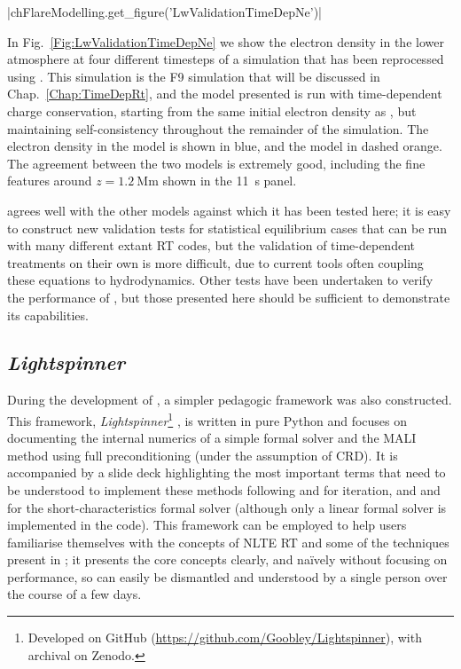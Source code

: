 \py[FlareModelling]|chFlareModelling.get_figure('LwValidationTimeDepNe')|

In Fig.~\ref{Fig:LwValidationTimeDepNe} we show the electron density in the lower atmosphere at four different timesteps of a \Radyn{} simulation that has been reprocessed using \Lw{}.
This simulation is the F9 simulation that will be discussed in Chap.~\ref{Chap:TimeDepRt}, and the \Lw{} model presented is run with time-dependent charge conservation, starting from the same initial electron density as \Radyn{}, but maintaining self-consistency throughout the remainder of the simulation.
The electron density in the \Radyn{} model is shown in blue, and the \Lw{} model in dashed orange.
The agreement between the two models is extremely good, including the fine features around $z=\SI{1.2}{\mega\metre}$ shown in the \SI{11}{\second} panel.

\Lw{} agrees well with the other models against which it has been tested here; it is easy to construct new validation tests for statistical equilibrium cases that can be run with many different extant RT codes, but the validation of time-dependent treatments on their own is more difficult, due to current tools often coupling these equations to hydrodynamics.
Other tests have been undertaken to verify the performance of \Lw{}, but those presented here should be sufficient to demonstrate its capabilities.


\subsection{\emph{Lightspinner}}

During the development of \Lw{}, a simpler pedagogic framework was also constructed.
This framework, \emph{Lightspinner}\footnote{Developed on GitHub (\url{https://github.com/Goobley/Lightspinner}), with archival on Zenodo.} \citep{Lightspinner}, is written in pure Python and focuses on documenting the internal numerics of a simple formal solver and the MALI method using full preconditioning (under the assumption of CRD).
It is accompanied by a slide deck highlighting the most important terms that need to be understood to implement these methods following \citet{Rybicki1992} and \citet{Uitenbroek2001} for iteration, and \citet{Kunasz1988} and \citet{Auer1994} for the short-characteristics formal solver (although only a linear formal solver is implemented in the code). This framework can be employed to help users familiarise themselves with the concepts of NLTE RT and some of the techniques present in \Lw{}; it presents the core concepts clearly, and naïvely without focusing on performance, so can easily be dismantled and understood by a single person over the course of a few days.

